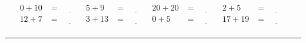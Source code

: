\documentclass{article}
\begin{document}
\begin{sloppy}
\begin{align*}
    {0} + {10} &= \underline{\hspace{1cm}} & {5} + {9} &= \underline{\hspace{1cm}} & {20} + {20} &= \underline{\hspace{1cm}} & {2} + {5} &= \underline{\hspace{1cm}} \\
    {12} + {7} &= \underline{\hspace{1cm}} & {3} + {13} &= \underline{\hspace{1cm}} & {0} + {5} &= \underline{\hspace{1cm}} & {17} + {19} &= \underline{\hspace{1cm}} \\
\end{align*}
\hrule
\end{sloppy}
\end{document}
